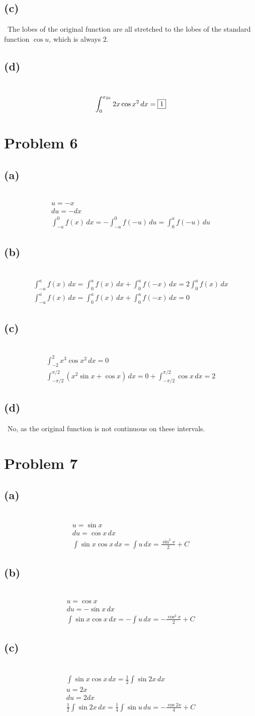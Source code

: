 \documentclass[12pt]{article}
\newcommand{\vem}{\vspace{0.5em}}
\newcommand{\problem}[1]{\section{Problem #1}}
\newcommand{\subproblem}[1]{\subsection{(#1)} \,}
\begin{document}
\subproblem{c}
The lobes of the original function are all stretched to the lobes of the standard function $\cos u$, which is always 2.\vem

\subproblem{d}
\[
\int_0^{x_{2k}} 2x\cos x^2\, dx= \boxed{1}\\
\]

\problem{6}

\subproblem{a}
\begin{gather*}
    u=-x\\
    du=-dx\\
    \int_{-a}^0f(x)\, dx=-\int_{-a}^0f(-u)\, du=\int_{0}^af(-u)\, du
\end{gather*}

\subproblem{b}
\begin{gather*}
    \int_{-a}^af(x)\, dx=\int_{0}^af(x)\, dx+\int_{0}^af(-x)\, dx=2\int_{0}^af(x)\, dx\\
    \int_{-a}^af(x)\, dx=\int_{0}^af(x)\, dx+\int_{0}^af(-x)\, dx=0
\end{gather*}

\subproblem{c}
\begin{gather*}
    \int_{-2}^2x^3\cos x^2\, dx=0\\
     \int_{-\pi/2}^{\pi/2} (x^2 \sin x + \cos x) \, dx=0+     \int_{-\pi/2}^{\pi/2} \cos x\, dx=2
\end{gather*}

\subproblem{d}
No, as the original function is not continuous on these intervals.

\problem{7}

\subproblem{a}
\begin{gather*}
    u=\sin x\\
    du =\cos x\, dx\\
    \int \sin x \cos x \, dx = \int u\, dx= \boxed{\frac{\sin^2 x}{2}+C}
\end{gather*}

\subproblem{b}
\begin{gather*}
    u=\cos x\\
    du =-\sin  x\, dx\\
    \int \sin x \cos x \, dx = -\int u\, dx=\boxed{-\frac{\cos^2x}{2}+C}
\end{gather*}

\subproblem{c}
\begin{gather*}
    \int \sin x \cos x \, dx= \frac{1}{2}\int \sin 2x\, dx \\
    u=2x\\
    du=2dx\\
    \frac{1}{2}\int \sin 2x\, dx =\frac{1}{4}\int \sin u \, du=\boxed{-\frac{\cos 2x}{4}+C}
\end{gather*}
\end{document}
